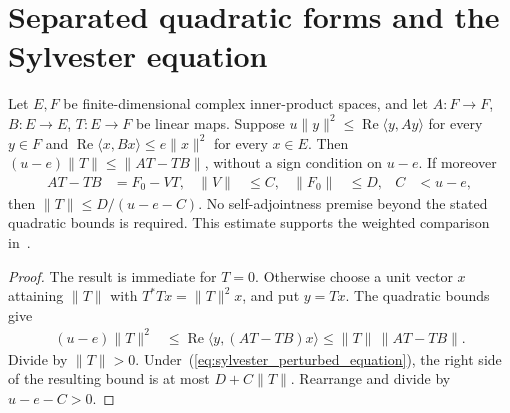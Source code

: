 \section{Separated quadratic forms and the Sylvester equation}

\begin{theorem}
    \label{thm:separated_quadratic_sylvester}
    \leanok
    Let $E,F$ be finite-dimensional complex inner-product spaces, and let
    $A:F\to F$, $B:E\to E$, $T:E\to F$ be linear maps. Suppose
    $u\|y\|^2\le\operatorname{Re}\langle y,Ay\rangle$ for every $y\in F$ and
    $\operatorname{Re}\langle x,Bx\rangle\le e\|x\|^2$ for every $x\in E$.
    Then $(u-e)\|T\|\le\|AT-TB\|$, without a sign condition on $u-e$.
    If moreover
    \begin{align}
        AT-TB & =F_0-VT, & \|V\| & \le C, & \|F_0\| & \le D, & C & <u-e,
        \label{eq:sylvester_perturbed_equation}
    \end{align}
    then $\|T\|\le D/(u-e-C)$.
    No self-adjointness premise beyond the stated quadratic bounds is required.
    This estimate supports the weighted comparison
    in~\cite[lines 1010--1024]{Arad2016RigorousRG}.
\end{theorem}
\begin{proof}
    \leanok
    The result is immediate for $T=0$. Otherwise choose a unit vector $x$
    attaining $\|T\|$ with $T^*Tx=\|T\|^2x$, and put $y=Tx$.
    The quadratic bounds give
    \begin{align}
        (u-e)\|T\|^2
         & \le\operatorname{Re}\langle y,(AT-TB)x\rangle
        \le\|T\|\,\|AT-TB\|.
        \label{eq:sylvester_quadratic_bound}
    \end{align}
    Divide by $\|T\|>0$. Under~(\ref{eq:sylvester_perturbed_equation}),
    the right side of the resulting bound is at most $D+C\|T\|$.
    Rearrange and divide by $u-e-C>0$.
\end{proof}
